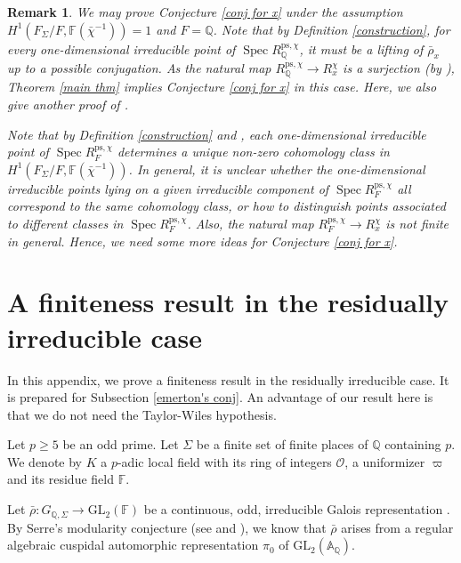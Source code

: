 \documentclass[a4paper, 12pt]{amsart}
\newtheorem{rem}[thm]{\bf Remark}
\DeclareMathOperator{\Spec}{Spec}
\def\ps{\mathrm{ps}}
\newcommand{\F}{\mathbb{F}}
\newcommand{\Q}{\mathbb{Q}}
\newcommand{\A}{\mathbb{A}}
\newcommand{\GL}{\mathrm{GL}}
\newcommand{\cO}{\mathcal{O}}
\begin{document}
    \begin{rem}
    	We may prove Conjecture \ref{conj for x} under the assumption $H^1(F_\Sigma/F, \F(\bar{\chi}^{-1}))=1$ and $F=\Q$. Note that by Definition \ref{construction}, for every one-dimensional irreducible point of $\Spec R_{\Q}^{\ps, \chi}$, it must be a lifting of $\bar{\rho}_x$ up to a possible conjugation. As the natural map $R_{\Q}^{\ps, \chi} \to R_x^{\chi} $ is a surjection (by \cite[Corollary 1.4.4]{kisin2009fontaine}), Theorem \ref{main thm} implies Conjecture \ref{conj for x} in this case. Here, we also give another proof of \cite[Theorem A]{Deo2023}.
    	
    	Note that by Definition \ref{construction} and \cite[Lemma 2.7]{Skinner_1999}, each one-dimensional irreducible point of $\Spec R_{F}^{\ps, \chi}$ determines a unique non-zero cohomology class in $H^1(F_\Sigma/F, \F(\bar{\chi}^{-1}))$. In general, it is unclear whether the one-dimensional irreducible points lying on a given irreducible component of $\Spec R_{F}^{\ps, \chi}$ all correspond to the same cohomology class, or how to distinguish points associated to different classes in $\Spec R_{F}^{\ps, \chi}$. Also, the natural map $R_{F}^{\ps, \chi} \to R_x^{\chi} $ is not finite in general. Hence, we need some more ideas for Conjecture \ref{conj for x}.
    \end{rem}
    
    
    \appendix
    \section{A finiteness result in the residually irreducible case}\label{A}
    In this appendix, we prove a finiteness result in the residually irreducible case. It is prepared for Subsection \ref{emerton's conj}. An advantage of our result here is that we do not need the Taylor-Wiles hypothesis.
    
    Let $p \ge 5$ be an odd prime. Let $\Sigma$ be a finite set of finite places of $\Q$ containing $p$. We denote by $K$  a $p$-adic local field with its ring of integers $\cO$, a uniformizer $\varpi$ and its residue field $\F$.
    
    Let $\bar{\rho} : G_{\Q, \Sigma} \to \GL_2(\F)$ be a continuous, odd, irreducible Galois representation . By Serre's modularity conjecture (see \cite{Khare_2009a} and \cite{Khare_2009}), we know that $\bar{\rho}$ arises from a regular algebraic cuspidal automorphic representation $\pi_0$ of $\GL_2(\A_\Q)$.
    
\end{document}
